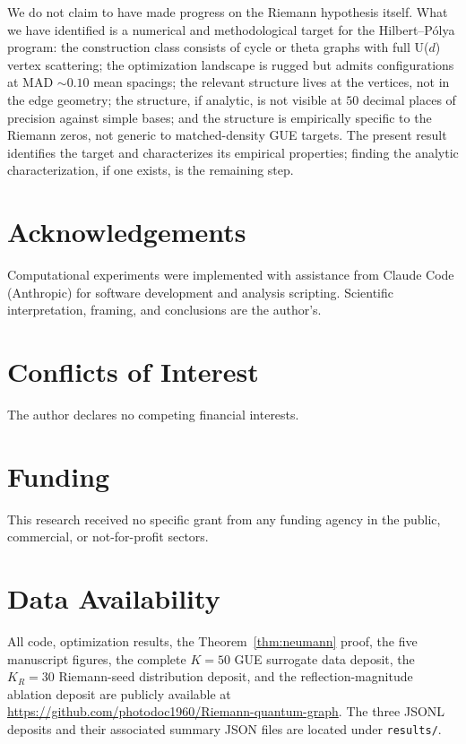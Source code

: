 \documentclass[cntp]{ipart}
\theoremstyle{plain}
\theoremstyle{remark}
\begin{document}
We do not claim to have made progress on the Riemann hypothesis itself. What we have identified is a numerical and methodological target for the Hilbert--P\'olya program: the construction class consists of cycle or theta graphs with full U($d$) vertex scattering; the optimization landscape is rugged but admits configurations at MAD $\sim 0.10$ mean spacings; the relevant structure lives at the vertices, not in the edge geometry; the structure, if analytic, is not visible at $50$ decimal places of precision against simple bases; and the structure is empirically specific to the Riemann zeros, not generic to matched-density GUE targets. The present result identifies the target and characterizes its empirical properties; finding the analytic characterization, if one exists, is the remaining step.

\section*{Acknowledgements}

Computational experiments were implemented with assistance from Claude Code (Anthropic) for software development and analysis scripting. Scientific interpretation, framing, and conclusions are the author's.

\section*{Conflicts of Interest}

The author declares no competing financial interests.

\section*{Funding}

This research received no specific grant from any funding agency in the public, commercial, or not-for-profit sectors.

\section*{Data Availability}

{\sloppy All code, optimization results, the Theorem~\ref{thm:neumann} proof, the five manuscript figures, the complete $K = 50$ GUE surrogate data deposit, the $K_R = 30$ Riemann-seed distribution deposit, and the reflection-magnitude ablation deposit are publicly available at \url{https://github.com/photodoc1960/Riemann-quantum-graph}. The three JSONL deposits and their associated summary JSON files are located under \texttt{results/}.\par}
\end{document}
